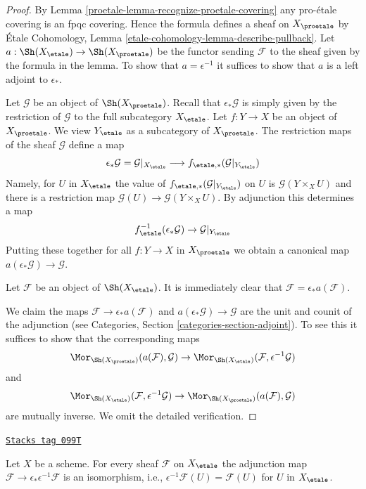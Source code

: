 \begin{proof}

By Lemma \ref{proetale-lemma-recognize-proetale-covering} any pro-\'etale covering
is an fpqc covering. Hence the formula defines a sheaf on $X_\proetale$
by \'Etale Cohomology, Lemma \ref{etale-cohomology-lemma-describe-pullback}.
Let $a : \Sh(X_\etale) \to \Sh(X_\proetale)$ be the functor
sending $\mathcal{F}$ to the sheaf given by the formula in the lemma.
To show that $a = \epsilon^{-1}$ it suffices to show that $a$ is a
left adjoint to $\epsilon_*$.

\medskip\noindent
Let $\mathcal{G}$ be an object of $\Sh(X_\proetale)$.
Recall that $\epsilon_*\mathcal{G}$ is simply given by the restriction of
$\mathcal{G}$ to the full subcategory $X_\etale$.
Let $f : Y \to X$ be an object of $X_\proetale$.
We view $Y_\etale$ as a subcategory of $X_\proetale$.
The restriction maps of the sheaf $\mathcal{G}$ define a map
$$
\epsilon_*\mathcal{G} = \mathcal{G}|_{X_\etale}
\longrightarrow
f_{\etale, *}(\mathcal{G}|_{Y_\etale})
$$
Namely, for $U$ in $X_\etale$ the value of
$f_{\etale, *}(\mathcal{G}|_{Y_\etale})$ on $U$
is $\mathcal{G}(Y \times_X U)$ and there is a restriction
map $\mathcal{G}(U) \to \mathcal{G}(Y \times_X U)$.
By adjunction this determines a map
$$
f_\etale^{-1}(\epsilon_*\mathcal{G}) \to \mathcal{G}|_{Y_\etale}
$$
Putting these together for all $f : Y \to X$ in $X_\proetale$
we obtain a canonical map $a(\epsilon_*\mathcal{G}) \to \mathcal{G}$.

\medskip\noindent
Let $\mathcal{F}$ be an object of $\Sh(X_\etale)$. It is immediately
clear that $\mathcal{F} = \epsilon_*a(\mathcal{F})$.

\medskip\noindent
We claim the maps $\mathcal{F} \to \epsilon_*a(\mathcal{F})$ and
$a(\epsilon_*\mathcal{G}) \to \mathcal{G}$
are the unit and counit of the adjunction (see
Categories, Section \ref{categories-section-adjoint}).
To see this it suffices to show that the corresponding maps
$$
\Mor_{\Sh(X_\proetale)}(a(\mathcal{F}), \mathcal{G}) \to
\Mor_{\Sh(X_\etale)}(\mathcal{F}, \epsilon^{-1}\mathcal{G})
$$
and
$$
\Mor_{\Sh(X_\etale)}(\mathcal{F}, \epsilon^{-1}\mathcal{G}) \to
\Mor_{\Sh(X_\proetale)}(a(\mathcal{F}), \mathcal{G})
$$
are mutually inverse. We omit the detailed verification.
\end{proof}

\begin{lemma}
\label{proetale-lemma-fully-faithful}
\href{https://stacks.math.columbia.edu/tag/099T}{\texttt{Stacks tag 099T}}

Let $X$ be a scheme. For every sheaf $\mathcal{F}$ on $X_\etale$
the adjunction map $\mathcal{F} \to \epsilon_*\epsilon^{-1}\mathcal{F}$ is an
isomorphism, i.e., $\epsilon^{-1}\mathcal{F}(U) = \mathcal{F}(U)$
for $U$ in $X_\etale$.
\end{lemma}

